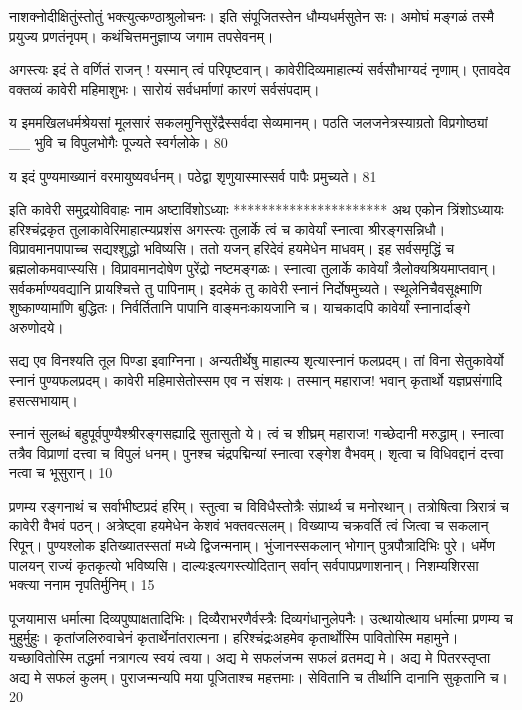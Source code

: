 नाशक्नोदीक्षितुंस्तोतुं भक्त्युत्कण्ठाश्रुलोचनः।
इति संपूजितस्तेन धौम्यधर्मसुतेन सः।
अमोघं मङ्गळं तस्मै प्रयुज्य प्रणतंनृपम्।
कथंचित्तमनुज्ञाप्य जगाम तपसेवनम्।

अगस्त्यः
इदं ते वर्णितं राजन् ! यस्मान् त्वं परिपृष्टवान्।
कावेरीदिव्यमाहात्म्यं सर्वसौभाग्यदं नृणाम्।
एतावदेव वक्तव्यं कावेरी महिमाशुभः।
सारोयं सर्वधर्माणां कारणं सर्वसंपदाम्।

य इममखिलधर्मश्रेयसां मूलसारं
सकलमुनिसुरेंद्रैस्सर्वदा सेव्यमानम्।
पठति जलजनेत्रस्याग्रतो विप्रगोष्ठ्यां __ भुवि च विपुलभोगैः पूज्यते स्वर्गलोके।
80

य इदं पुण्यमाख्यानं वरमायुष्यवर्धनम्।
पठेद्वा शृणुयास्मास्सर्व पापैः प्रमुच्यते।
81

इति कावेरी समुद्रयोविवाहः नाम अष्टाविंशोऽध्याः
**********************
अथ एकोन त्रिंशोऽध्यायः हरिश्चंद्रकृत तुलाकावेरिमाहात्म्यप्रशंस
अगस्त्यः
तुलार्के त्वं च कावेर्यां स्नात्वा श्रीरङ्गसन्निधौ।
विप्रावमानपापाच्च सद्यश्शुद्धो भविष्यसि।
ततो यजन् हरिदेवं हयमेधेन माधवम्।
इह सर्वसमृद्धिं च ब्रह्मलोकमवाप्स्यसि।
विप्रावमानदोषेण पुरेंद्रो नष्टमङ्गळः।
स्नात्वा तुलार्के कावेर्यां त्रैलोक्यश्रियमाप्तवान्।
सर्वकर्माण्यवद्यानि प्रायश्चित्ते तु पापिनाम्।
इदमेकं तु कावेरी स्नानं निर्दोषमुच्यते।
स्थूलेनिचैवसूक्ष्माणि शुष्काण्यामा॑णि बुद्धितः।
निर्वर्तितानि पापानि वाङ्मनःकायजानि च।
याचकादपि कावेर्यां स्नानार्दाङ्गे अरुणोदये।

सद्य एव विनश्यति तूल पिण्डा इवाग्निना।
अन्यतीर्थेषु माहात्म्य शृत्यास्नानं फलप्रदम्।
तां विना सेतुकावेर्यो स्नानं पुण्यफलप्रदम्।
कावेरी महिमासेतोस्सम एव न संशयः।
तस्मान् महाराज! भवान् कृतार्थो यज्ञप्रसंगादि
हसत्सभायाम्।

स्नानं सुलब्धं बहुपूर्वपुण्यैश्श्रीरङ्गसह्याद्रि सुतासुतो ये।
त्वं च शीघ्रम् महाराज! गच्छेदानी मरुद्धाम्।
स्नात्वा तत्रैव विप्राणां दत्त्वा च विपुलं धनम्।
पुनश्च चंद्रपद्मिन्यां स्नात्वा रङ्गेश वैभवम्।
शृत्वा च विधिवद्दानं दत्त्वा नत्वा च भूसुरान्।
10

प्रणम्य रङ्गनाथं च सर्वाभीष्टप्रदं हरिम्।
स्तुत्वा च विविधैस्तोत्रैः संप्रार्थ्य च मनोरथान्।
तत्रोषित्वा त्रिरात्रं च कावेरी वैभवं पठन्।
अत्रेष्ट्वा हयमेधेन केशवं भक्तवत्सलम्।
विख्याप्य चक्रवर्ति त्वं जित्वा च सकलान् रिपून्।
पुण्यश्लोक इतिख्यातस्सतां मध्ये द्विजन्मनाम्।
भुंजानस्सकलान् भोगान् पुत्रपौत्रादिभिः पुरे।
धर्मेण पालयन् राज्यं कृतकृत्यो भविष्यसि।
दाल्यःइत्यगस्त्योदितान् सर्वान् सर्वपापप्रणाशनान्।
निशम्यशिरसा भक्त्या ननाम नृपतिर्मुनिम्।
15


पूजयामास धर्मात्मा दिव्यपुष्पाक्षतादिभिः।
दिव्यैराभरणैर्वस्त्रैः दिव्यगंधानुलेपनैः।
उत्थायोत्थाय धर्मात्मा प्रणम्य च मुहुर्मुहुः।
कृतांजलिरुवाचेनं कृतार्थेनांतरात्मना।
हरिश्चंद्रःअहमेव कृतार्थोस्मि पावितोस्मि महामुने।
यच्छावितोस्मि तद्धर्मा नत्रागत्य स्वयं त्वया।
अद्य मे सफलंजन्म सफलं व्रतमद्य मे।
अद्य मे पितरस्तृप्ता अद्य मे सफलं कुलम्।
पुराजन्मन्यपि मया पूजिताश्च महत्तमाः।
सेवितानि च तीर्थानि दानानि सुकृतानि च।
20

